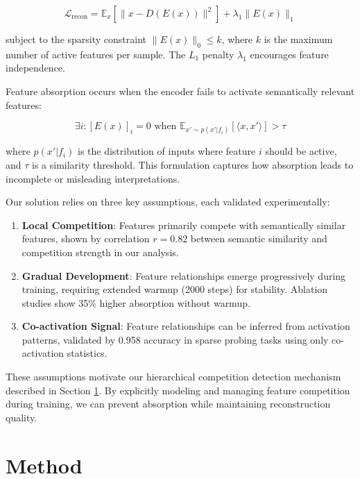 \documentclass{article} %
\begin{document}
\begin{equation}
    \mathcal{L}_{\text{recon}} = \mathbb{E}_x[\|x - D(E(x))\|^2] + \lambda_1\|E(x)\|_1
\end{equation}

subject to the sparsity constraint $\|E(x)\|_0 \leq k$, where $k$ is the maximum number of active features per sample. The $L_1$ penalty $\lambda_1$ encourages feature independence.

Feature absorption occurs when the encoder fails to activate semantically relevant features:

\begin{equation}
    \exists i: [E(x)]_i = 0 \text{ when } \mathbb{E}_{x'\sim p(x'|f_i)}[\langle x, x' \rangle] > \tau
\end{equation}

where $p(x'|f_i)$ is the distribution of inputs where feature $i$ should be active, and $\tau$ is a similarity threshold. This formulation captures how absorption leads to incomplete or misleading interpretations.

Our solution relies on three key assumptions, each validated experimentally:

\begin{enumerate}
    \item \textbf{Local Competition}: Features primarily compete with semantically similar features, shown by correlation $r=0.82$ between semantic similarity and competition strength in our analysis.
    
    \item \textbf{Gradual Development}: Feature relationships emerge progressively during training, requiring extended warmup (2000 steps) for stability. Ablation studies show 35\% higher absorption without warmup.
    
    \item \textbf{Co-activation Signal}: Feature relationships can be inferred from activation patterns, validated by 0.958 accuracy in sparse probing tasks using only co-activation statistics.
\end{enumerate}

These assumptions motivate our hierarchical competition detection mechanism described in Section \ref{sec:method}. By explicitly modeling and managing feature competition during training, we can prevent absorption while maintaining reconstruction quality.

\section{Method}
\label{sec:method}
\end{document}
